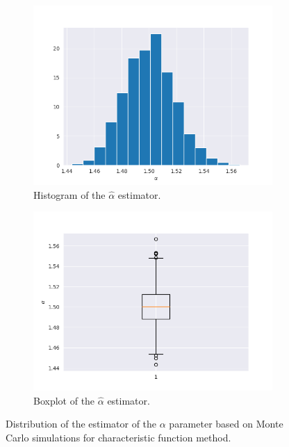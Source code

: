 \documentclass{article}
\begin{document}
		\begin{figure}[H]
			\begin{subfigure}{.5\textwidth}
				\centering
				\includegraphics[width=1\linewidth]{images/cf_alpha_hist.png}
				\caption{Histogram of the $\hat\alpha$ estimator.}\label{CF_line2}
			\end{subfigure}
			\begin{subfigure}[r]{.5\textwidth}
				\centering
				\includegraphics[width=1\linewidth]{images/cf_alpha_boxplot.png}
				\caption{Boxplot of the $\hat\alpha$ estimator.}
			\end{subfigure}
			\caption{Distribution of the estimator of the $\alpha$ parameter based on Monte Carlo simulations for characteristic function method.}\label{alpha2}
		\end{figure}
		
\end{document}
